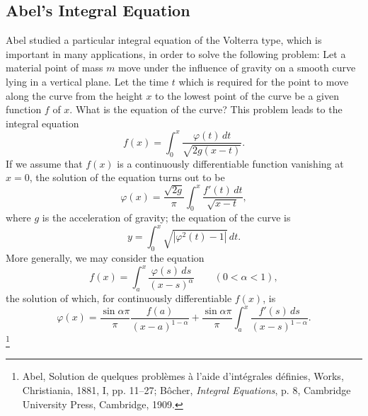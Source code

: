 \subsection{Abel's Integral Equation}
Abel studied a particular integral equation of the Volterra type, which is important in many applications, in order to solve the following problem: Let a material point of mass $m$ move under the influence of gravity on a smooth curve lying in a vertical plane. Let the time $t$ which is required for the point to move along the curve from the height $x$ to the lowest point of the curve be a given function $f$ of $x$. What is the equation of the curve? This problem leads to the integral equation
\[
f(x)=\int_0^x\frac{\varphi(t)\,dt}{\sqrt{2g(x-t)}}.
\]
If we assume that $f(x)$ is a continuously differentiable function vanishing at $x=0$, the solution of the equation turns out to be
\[
\varphi(x)=\frac{\sqrt{2g}}{\pi}\int_0^x\frac{f'(t)\,dt}{\sqrt{x-t}},
\]
where $g$ is the acceleration of gravity; the equation of the curve is
\[
y=\int_0^x\sqrt{|\varphi^2(t)-1|}\,dt.
\]
More generally, we may consider the equation
\[
f(x)=\int_a^x\frac{\varphi(s)\,ds}{(x-s)^\alpha}
\qquad (0<\alpha<1),
\]
the solution of which, for continuously differentiable $f(x)$, is
\[
\varphi(x)=\frac{\sin\alpha\pi}{\pi}\frac{f(a)}{(x-a)^{1-\alpha}}
+\frac{\sin\alpha\pi}{\pi}\int_a^x\frac{f'(s)\,ds}{(x-s)^{1-\alpha}}.
\]
\footnote{Abel, Solution de quelques probl\`emes \`a l'aide d'int\'egrales d\'efinies, Works, Christiania, 1881, I, pp. 11--27; B\^ocher, \emph{Integral Equations}, p. 8, Cambridge University Press, Cambridge, 1909.}

